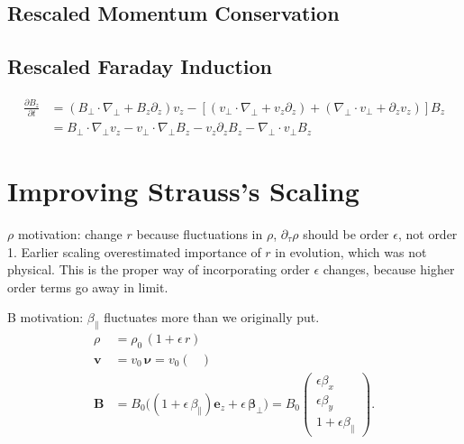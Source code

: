 \documentclass{article}
\newcommand{\para}{\parallel}
\newcommand{\ep}{\epsilon}
\newcommand{\np}{\nabla_\perp}
\newcommand{\p}{\partial}
\newcommand{\deriv}[2]{\frac{\p #1}{\p #2}}
\newcommand{\pth} [1] {\left( #1 \right) }
\newcommand{\br} [1] {\left[ #1 \right] }
\newcommand{\pmat} [1] {\begin{pmatrix} #1 \end{pmatrix}}
\begin{document}
\subsection{Rescaled Momentum Conservation}

\subsection{Rescaled Faraday Induction}
\begin{align*} 
\deriv{B_z}{t} &= 
    \pth{B_\perp\cdot\np + B_z\p_z}v_z - \br{(v_\perp\cdot\np + v_z\p_z) + (\np\cdot v_\perp + \p_zv_z)} B_z \\
    &= B_\perp\cdot\np v_z - v_\perp\cdot\np B_z - v_z\p_zB_z - \np \cdot v_\perp B_z 
\end{align*}



\section{Improving Strauss's Scaling}
$\rho$ motivation: change $r$ because fluctuations in $\rho$, $\p_\tau \rho$ should be order $\ep$, not order 1. Earlier scaling overestimated importance of $r$ in evolution, which was not physical. This is the proper way of incorporating order $\ep$ changes, because higher order terms go away in limit. 

B motivation: $\beta_\para$ fluctuates more than we originally put. 
\begin{align*}
    \rho &= \rho_0\,(1 + \epsilon\,r)\\
    \bm{v} & = v_0\,\bm{\nu} = v_0 \pmat{} \\
    \bm{B} & = B_0\bigg((1 + \epsilon\,\beta_\parallel)\bm{e}_z + \epsilon\,\bm{\beta}_\perp\bigg) = B_0 \pmat{\ep\beta_x \\ \ep\beta_y \\ 1+\ep\beta_\para} .
\end{align*}
\end{document}
